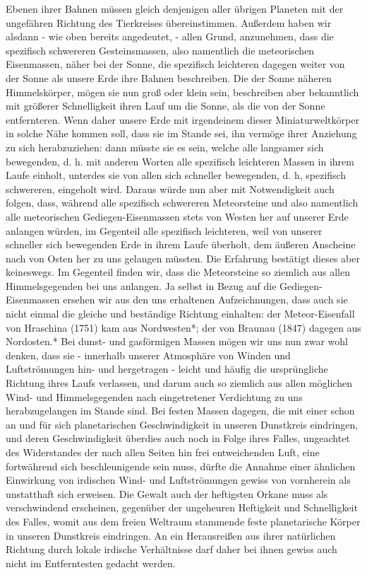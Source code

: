 \documentclass[a4paper, 11pt, oneside, polutonikogreek, german]{article}
\begin{document}
Ebenen ihrer Bahnen müssen gleich denjenigen aller übrigen Planeten mit der ungefähren Richtung des Tierkreises übereinstimmen. Außerdem haben wir alsdann - wie oben bereits angedeutet, - allen Grund, anzunehmen, dass die spezifisch schwereren Gesteinsmassen, also namentlich die meteorischen Eisenmassen, näher bei der Sonne, die spezifisch leichteren dagegen weiter von der Sonne als unsere Erde ihre Bahnen beschreiben. Die der Sonne näheren Himmelskörper, mögen sie nun groß oder klein sein, beschreiben aber bekanntlich mit größerer Schnelligkeit ihren Lauf um die Sonne, als die von der Sonne entfernteren. Wenn daher unsere Erde mit irgendeinem dieser Miniaturweltkörper in solche Nähe kommen soll, dass sie im Stande sei, ihn vermöge ihrer Anziehung zu sich herabzuziehen: dann müsste sie es sein, welche alle langsamer sich bewegenden, d. h. mit anderen Worten alle spezifisch leichteren Massen in ihrem Laufe einholt, unterdes sie von allen sich schneller bewegenden, d. h, spezifisch schwereren, eingeholt wird. Daraus würde nun aber mit Notwendigkeit auch folgen, dass, während alle spezifisch schwereren Meteorsteine und also namentlich alle meteorischen Gediegen-Eisenmassen stets von Westen her auf unserer Erde anlangen würden, im Gegenteil alle spezifisch leichteren, weil von unserer schneller sich bewegenden Erde in ihrem Laufe überholt, dem äußeren Anscheine nach von Osten her zu uns gelangen müssten. Die Erfahrung bestätigt dieses aber keineswegs. Im Gegenteil finden wir, dass die Meteorsteine so ziemlich aus allen Himmelsgegenden bei uns anlangen. Ja selbst in Bezug auf die Gediegen-Eisenmassen ersehen wir aus den uns erhaltenen Aufzeichnungen, dass auch sie nicht einmal die gleiche und beständige Richtung einhalten: der Meteor-Eisenfall von Hraschina (1751) kam aus Nordwesten*; der von Braunau (1847) dagegen aus Nordosten.* Bei dunst- und gasförmigen Massen mögen wir uns nun zwar wohl denken, dass sie - innerhalb unserer Atmosphäre von Winden und Luftströmungen hin- und hergetragen - leicht und häufig die ursprüngliche Richtung ihres Laufs verlassen, und darum auch so ziemlich aus allen möglichen Wind- und Himmelsgegenden nach eingetretener Verdichtung zu uns herabzugelangen im Stande sind. Bei festen Massen dagegen, die mit einer schon an und für sich planetarischen Geschwindigkeit in unseren Dunstkreis eindringen, und deren Geschwindigkeit überdies auch noch in Folge ihres Falles, ungeachtet des Widerstandes der nach allen Seiten hin frei entweichenden Luft, eine fortwährend sich beschleunigende sein muss, dürfte die Annahme einer ähnlichen Einwirkung von irdischen Wind- und Luftströmungen gewiss von vornherein als unstatthaft sich erweisen. Die Gewalt auch der heftigsten Orkane muss als verschwindend erscheinen, gegenüber der ungeheuren Heftigkeit und Schnelligkeit des Falles, womit aus dem freien Weltraum stammende feste planetarische Körper in unseren Dunstkreis eindringen. An ein Herausreißen aus ihrer natürlichen Richtung durch lokale irdische Verhältnisse darf daher bei ihnen gewiss auch nicht im Entferntesten gedacht werden.
\end{document}
